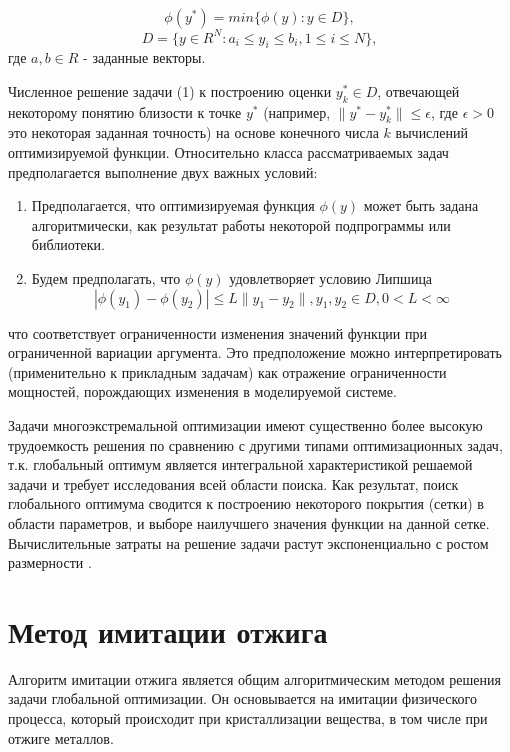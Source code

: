 \documentclass[11pt, oneside, a4paper]{article}
\begin{document}
\begin{equation*}   %
\phi(y^*) = min\{\phi(y):y\in D\},
\end{equation*}
\begin{equation}   %
D = \{y \in R^N : a_i \leq y_i \leq b_i,
1 \leq i \leq N \},
\end{equation}
где $a,b \in R$ - заданные векторы.


Численное решение задачи (1) к построению оценки $y_k^* \in D$, отвечающей некоторому понятию близости к точке $y^*$ (например, $\parallel y^*-y_k^* \parallel \leq \epsilon$, где $\epsilon>0$ это некоторая заданная точность) на основе конечного числа $k$ вычислений оптимизируемой функции. Относительно класса рассматриваемых задач предполагается выполнение двух важных условий:
\begin{enumerate}
\item Предполагается, что оптимизируемая функция $\phi(y)$ может быть задана алгоритмически, как результат работы некоторой подпрограммы или библиотеки.

\item Будем предполагать, что $\phi(y)$ удовлетворяет условию Липшица
\begin{equation}
|\phi(y_1)-\phi(y_2)|\leq L\parallel y_1-y_2 \parallel
,y_1,y_2 \in D, 0<L< \infty
\end{equation}
\end{enumerate}
что соответствует ограниченности изменения значений функции при ограниченной вариации аргумента. Это предположение можно интерпретировать (применительно к прикладным задачам) как отражение ограниченности мощностей, порождающих изменения в моделируемой системе.

Задачи многоэкстремальной оптимизации имеют существенно более высокую трудоемкость решения по сравнению с другими типами оптимизационных задач, т.к. глобальный оптимум является интегральной характеристикой решаемой задачи и требует исследования всей области поиска. Как результат, поиск глобального оптимума сводится к построению некоторого покрытия (сетки) в области параметров, и выборе наилучшего значения функции на данной сетке. Вычислительные затраты на решение задачи растут экспоненциально с ростом размерности \cite{fio_bib7}.


\section{Метод имитации отжига}
Алгоритм имитации отжига является общим алгоритмическим методом решения задачи глобальной оптимизации. Он основывается на имитации физического процесса, который происходит при кристаллизации вещества, в том числе при отжиге металлов.
\end{document}
